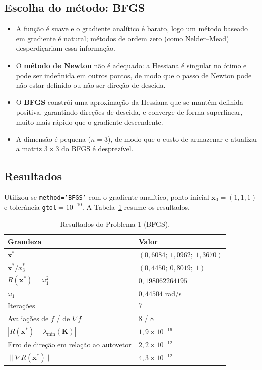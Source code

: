 \documentclass[12pt,a4paper]{article}
\begin{document}
\subsection{Escolha do método: BFGS}

\begin{itemize}
  \item A função é suave e o gradiente analítico é barato, logo um método baseado em gradiente é natural; métodos de ordem zero (como Nelder--Mead) desperdiçariam essa informação.
  \item O \textbf{método de Newton} não é adequado: a Hessiana é singular no ótimo e pode ser indefinida em outros pontos, de modo que o passo de Newton pode não estar definido ou não ser direção de descida.
  \item O \textbf{BFGS} constrói uma aproximação da Hessiana que se mantém definida positiva, garantindo direções de descida, e converge de forma superlinear, muito mais rápido que o gradiente descendente.
  \item A dimensão é pequena ($n=3$), de modo que o custo de armazenar e atualizar a matriz $3\times3$ do BFGS é desprezível.
\end{itemize}

\newpage
\subsection{Resultados}

Utilizou-se \texttt{method='BFGS'} com o gradiente analítico, ponto inicial $\mathbf{x}_0=(1,1,1)$ e tolerância \texttt{gtol}$=10^{-10}$. A Tabela~\ref{tab:q1} resume os resultados.

\begin{table}[H]
\centering
\caption{Resultados do Problema 1 (BFGS).}
\label{tab:q1}
\begin{tabular}{@{}ll@{}}
\toprule
Grandeza & Valor \\
\midrule
$\mathbf{x}^*$ & $(0{,}6084;\ 1{,}0962;\ 1{,}3670)$ \\
$\mathbf{x}^*/x_3^*$ & $(0{,}4450;\ 0{,}8019;\ 1)$ \\
$R(\mathbf{x}^*) = \omega_1^2$ & $0{,}198062264195$ \\
$\omega_1$ & $0{,}44504$ rad/s \\
Iterações & 7 \\
Avaliações de $f$ / de $\nabla f$ & 8 / 8 \\
$|R(\mathbf{x}^*)-\lambda_{\min}(\mathbf{K})|$ & $1{,}9\times10^{-16}$ \\
Erro de direção em relação ao autovetor & $2{,}2\times10^{-12}$ \\
$\|\nabla R(\mathbf{x}^*)\|$ & $4{,}3\times10^{-12}$ \\
\bottomrule
\end{tabular}
\end{table}
\end{document}
